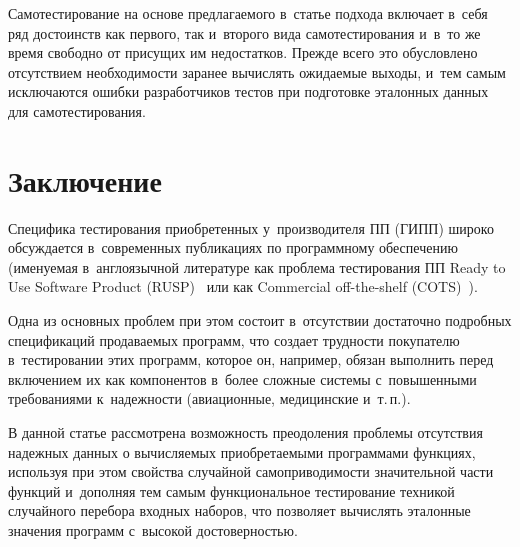 \begin{multicols}{2}
    Самотестирование на основе предлагаемого в~статье подхода включает 
в~себя ряд достоинств как первого, так и~второго вида самотестирования 
и~в~то же время свободно от присущих им недостатков. Прежде всего это 
обусловлено отсутствием необходимости заранее вычислять ожидаемые 
выходы, и~тем самым исключаются ошибки разработчиков тестов при 
подготовке эталонных данных для самотестирования.

\vspace*{-9pt}
    
\section{Заключение}

\vspace*{-3pt}

    Специфика тестирования приобретенных у~производителя ПП
     (ГИПП) широко обсуждается в~современных публикациях по 
программному обеспечению (именуемая в~англоязычной литературе как 
проблема тестирования ПП Ready to Use Software 
Product (RUSP)~\cite{7-bf} или как Commercial off-the-shelf  
(COTS)~\cite{18-bf}).
    
    Одна из основных проблем при этом состоит в~отсутствии достаточно 
подробных спецификаций продаваемых программ, что создает трудности 
покупателю в~тестировании этих программ, которое он, например, обязан 
выполнить перед включением их как компонентов в~более сложные системы с~повышенными требованиями к~надежности (авиационные, медицинские 
и~т.\,п.).
    
    В данной статье рассмотрена возможность преодоления проблемы 
отсутствия надежных данных о вычисляемых приобретаемыми программами 
функциях, используя при этом свойства случайной самоприводимости 
значительной части функций и~дополняя тем самым функциональное 
тестирование техникой случайного перебора входных наборов, что позволяет 
вычислять эталонные значения программ с~высокой достоверностью.
    

\end{multicols}
